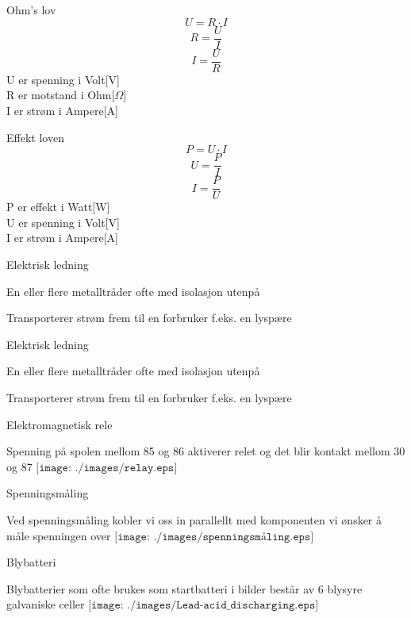 \documentclass[avery5388,grid,frame]{flashcards}
\begin{document}




\begin{flashcard}{Ohm's lov}
\vskip 0.5cm
	$$U = R \cdot I$$
\vskip 0.5cm
	$$R = \frac{U}{I}$$ 
\vskip 0.5cm
	$$I = \frac{U}{R}$$ 
\vskip 0.5cm
	U er spenning i Volt[V]\\R er motstand i Ohm[$\Omega$]\\I er strøm i Ampere[A]
\end{flashcard}


\begin{flashcard}{Effekt loven}
\vskip 0.5cm
	$$P = U \cdot I$$
\vskip 0.5cm
	$$U = \frac{P}{I}$$ 
\vskip 0.5cm
	$$I = \frac{P}{U}$$ 
\vskip 0.5cm
P er effekt i Watt[W]\\U er spenning i Volt[V]\\I er strøm i Ampere[A]
\end{flashcard}




\begin{flashcard}{Elektrisk ledning}
		\begin{description}
			\item En eller flere metalltråder ofte med isolasjon utenpå
			\item Transporterer strøm frem til en forbruker f.eks. en lyspære
		\end{description}
\end{flashcard}
\begin{flashcard}{Elektrisk ledning}
		\begin{description}
			\item En eller flere metalltråder ofte med isolasjon utenpå
			\item Transporterer strøm frem til en forbruker f.eks. en lyspære
		\end{description}
\end{flashcard}
\begin{flashcard}{Elektromagnetisk rele}
	\begin{multicols}{2}
		Spenning på spolen mellom 85 og 86 aktiverer relet og det blir kontakt mellom 30 og 87
		\columnbreak
$\texttt{[image: ./images/relay.eps]}$
	\end{multicols}
\end{flashcard}

\begin{flashcard}{Spenningsmåling}
	\begin{multicols}{2}
		Ved spenningsmåling kobler vi oss in parallellt med komponenten vi ønsker å måle spenningen over
		\columnbreak
$\texttt{[image: ./images/spenningsmåling.eps]}$
	\end{multicols}
\end{flashcard}

\begin{flashcard}{Blybatteri}
	\begin{multicols}{2}
		Blybatterier som ofte brukes som startbatteri i bilder består av 6 blysyre galvaniske celler
		\columnbreak
$\texttt{[image: ./images/Lead-acid\_discharging.eps]}$
	\end{multicols}
\end{flashcard}
\end{document}

